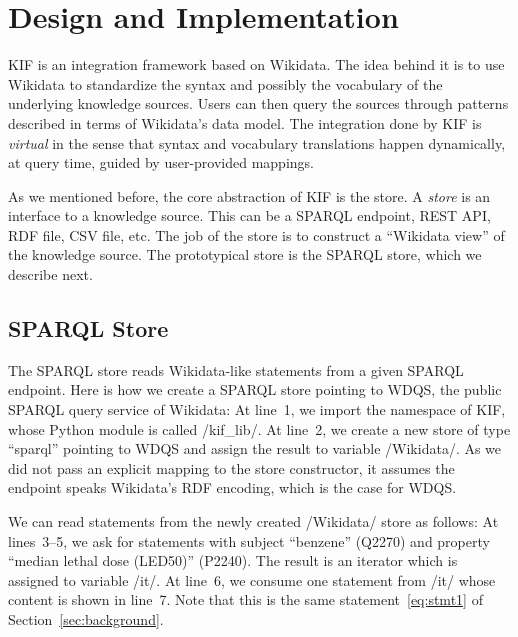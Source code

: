 \section{Design and Implementation}%
\label{sec:design-and-implementation}


KIF is an integration framework based on Wikidata.
The idea behind it is to use Wikidata to standardize the syntax and possibly the vocabulary of the underlying knowledge sources.
Users can then query the sources through patterns described in terms of Wikidata's data model.
The integration done by KIF is \emph{virtual} in the sense that syntax and vocabulary translations happen dynamically, at query time, guided by user-provided mappings.


As we mentioned before, the core abstraction of KIF is the store.
A \emph{store} is an interface to a knowledge source.
This can be a SPARQL endpoint, REST API, RDF file, CSV file, etc.
The job of the store is to construct a ``Wikidata view'' of the knowledge source.
The prototypical store is the SPARQL store, which we describe next.


\subsection{SPARQL Store}%
\label{sub:sparql-store}


The SPARQL store reads Wikidata-like statements from a given SPARQL endpoint.
Here is how we create a SPARQL store pointing to WDQS, the public SPARQL query service of Wikidata:
%
At line~1, we import the namespace of KIF, whose Python module is called \code/kif_lib/.
At line~2, we create a new store of type ``sparql'' pointing to WDQS and assign the result to variable \code/Wikidata/.
As we did not pass an explicit mapping to the store constructor, it assumes the endpoint speaks Wikidata's RDF encoding, which is the case for WDQS\@.


We can read statements from the newly created \code/Wikidata/ store as follows:
%
At lines~3--5, we ask for statements with subject ``benzene'' (Q2270) and property ``median lethal dose (LED50)'' (P2240).
The result is an iterator which is assigned to variable \code/it/.
At line~6, we consume one statement from \code/it/ whose content is shown in line~7.
Note that this is the same statement~\eqref{eq:stmt1} of Section~\ref{sec:background}.



